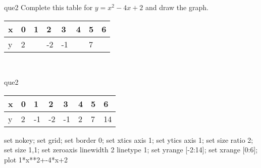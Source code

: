 \documentclass[13.5pt, varwidth=true]{beamer}
\begin{document}
\begin{frame}[shrink=19,fragile]
	\begin{beamercolorbox}[rounded=true, left, shadow=true,wd=14.8cm]{que2}
		 Complete this table for $y = x^{2} - 4x + 2$ and draw the graph. \\[0.3cm] \renewcommand{\arraystretch}{1.2}\begin{tabular}{|C|C|C|C|C|C|C|C|} \hline x & 0 & 1 & 2 & 3 & 4 & 5 & 6 \\ \hline y & 2 &  & -2 & -1 &  & 7 & \\ \hline \end{tabular}\\[0.3cm]
	\end{beamercolorbox}
\end{frame}
\begin{frame}[shrink=19,fragile]
	\begin{beamercolorbox}[rounded=true, left, shadow=true,wd=14.8cm]{que2}
		\renewcommand{\arraystretch}{1.2}\begin{tabular}{|C|C|C|C|C|C|C|C|} \hline x & 0 & 1 & 2 & 3 & 4 & 5 & 6 \\ \hline y & 2 & -1 & -2 & -1 & 2 & 7 & 14\\ \hline \end{tabular}\begin{gnuplot}[terminal=pdf] set nokey; set grid; set border 0; set xtics axis 1; set ytics axis 1; set size ratio 2; set size 1,1; set zeroaxis linewidth 2 linetype 1; set yrange [-2:14]; set xrange [0:6]; plot 1*x**2+-4*x+2 \end{gnuplot}
	\end{beamercolorbox}
\end{frame}
\end{document}
